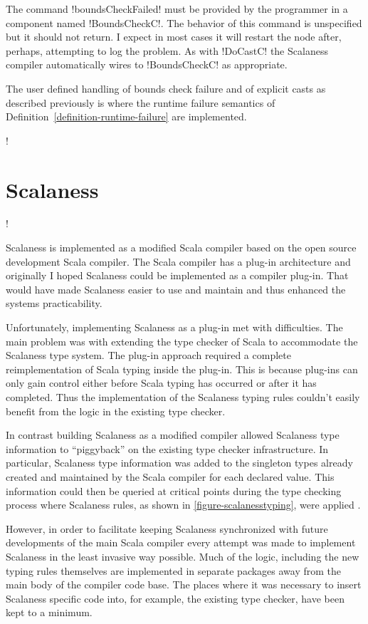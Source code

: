 The command !boundsCheckFailed! must be provided by the programmer in a component named
!BoundsCheckC!. The behavior of this command is unspecified but it should not return. I expect
in most cases it will restart the node after, perhaps, attempting to log the problem. As with
!DoCastC! the Scalaness compiler automatically wires to !BoundsCheckC! as appropriate.

The user defined handling of bounds check failure and of explicit casts as described previously
is where the runtime failure semantics of Definition~\ref{definition-runtime-failure} are
implemented.

\lstDeleteShortInline!

\section{Scalaness}
\label{section-scalaness-implementation}

\lstset{language=scalaness}
\lstMakeShortInline!

Scalaness is implemented as a modified Scala compiler \cite{scalaness-home} based on the open
source development Scala compiler. The Scala compiler has a plug-in architecture and originally
I hoped Scalaness could be implemented as a compiler plug-in. That would have made Scalaness
easier to use and maintain and thus enhanced the systems practicability.

Unfortunately, implementing Scalaness as a plug-in met with difficulties. The main problem was
with extending the type checker of Scala to accommodate the Scalaness type system. The plug-in
approach required a complete reimplementation of Scala typing inside the plug-in. This is
because plug-ins can only gain control either before Scala typing has occurred or after it has
completed. Thus the implementation of the Scalaness typing rules couldn't easily benefit from
the logic in the existing type checker.

In contrast building Scalaness as a modified compiler allowed Scalaness type information to
``piggyback'' on the existing type checker infrastructure. In particular, Scalaness type
information was added to the singleton types already created and maintained by the Scala
compiler for each declared value. This information could then be queried at critical points
during the type checking process where Scalaness rules, as shown in
\autoref{figure-scalanesstyping}, were applied \cite{watson-masters-2013}.

However, in order to facilitate keeping Scalaness synchronized with future developments of the
main Scala compiler every attempt was made to implement Scalaness in the least invasive way
possible. Much of the logic, including the new typing rules themselves are implemented in
separate packages away from the main body of the compiler code base. The places where it was
necessary to insert Scalaness specific code into, for example, the existing type checker, have
been kept to a minimum.

